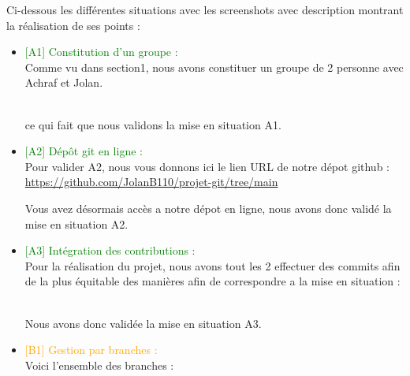 Ci-dessous les différentes situations avec les screenshots avec description montrant la réalisation de ses points :

\begin{itemize}
    \item \textcolor{green}{[A1] Constitution d’un groupe :}
    \\Comme vu dans section1, nous avons constituer un groupe de 2 personne avec Achraf et Jolan.
    
    \\ce qui fait que nous validons la mise en situation A1.

    \item \textcolor{green}{[A2] Dépôt git en ligne : }
    \\Pour valider A2, nous vous donnons ici le lien URL de notre dépot github : 
    \url{https://github.com/JolanB110/projet-git/tree/main}

    Vous avez désormais accès a notre dépot en ligne, nous avons donc validé la mise en situation A2.
    
    \item \textcolor{green}{[A3] Intégration des contributions : }
    \\ Pour la réalisation du projet, nous avons tout les 2 effectuer des commits afin de la plus équitable des manières afin de correspondre a la mise en situation :


    \\Nous avons donc validée la mise en situation A3.

    \item \textcolor{orange}{[B1] Gestion par branches : }
    \\ Voici l'ensemble des branches : \\ 
    

\end{itemize}
